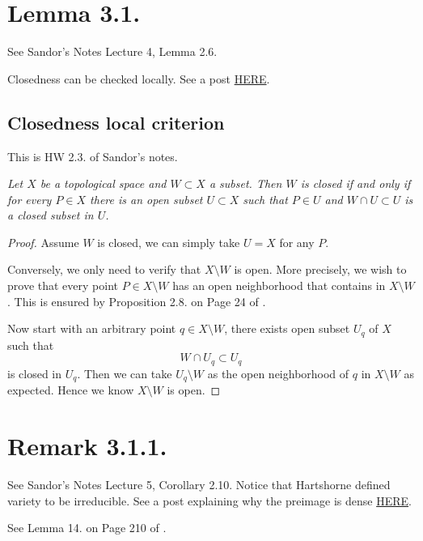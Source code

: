 \section{Lemma 3.1.}

See Sandor's Notes Lecture 4, Lemma 2.6.

Closedness can be checked locally. See a post \href{https://math.stackexchange.com/questions/717382/how-to-prove-that-z-is-closed-subset-iff-x-can-be-covered-by-open-subsets}{HERE}.

\subsection{Closedness local criterion}

This is HW 2.3. of Sandor's notes. 

\textit{Let $X$ be a topological space and $W \subset X$ a subset. Then $W$ is closed if and only if for every $P\in X$ there is an open subset $U \subset X$ such that $P \in U$ and $W \cap U \subset U$ is a closed subset in $U$.}

\begin{proof}
	Assume $W$ is closed, we can simply take $U=X$ for any $P$.

	Conversely, we only need to verify that $X\setminus W$ is open. More precisely, we wish to prove that every point $P\in X\setminus W$ has an open neighborhood that contains in $X\setminus W$. This is ensured by Proposition 2.8. on Page 24 of \cite{lee2010introduction}. 

	Now start with an arbitrary point $q\in X\setminus W$, there exists open subset $U_q$ of $X$ such that \[W\cap U_q\subset U_q\] is closed in $U_q$. Then we can take $U_q\setminus W$ as the open neighborhood of $q$ in $X\setminus W$ as expected. Hence we know $X\setminus W$ is open.
\end{proof} 

\section{Remark 3.1.1.}

See Sandor's Notes Lecture 5, Corollary 2.10.
Notice that Hartshorne defined variety to be irreducible.
See a post explaining why the preimage is dense \href{https://math.stackexchange.com/questions/2860498/regular-functions-are-determined-only-up-to-open-sets#:~:text=An%20important%20consequence%20of%20this,dense%2C%20hence%20equal%20to%20X.}{HERE}.

See Lemma 14. on Page 210 of \cite{bosch2013algebraic}.

